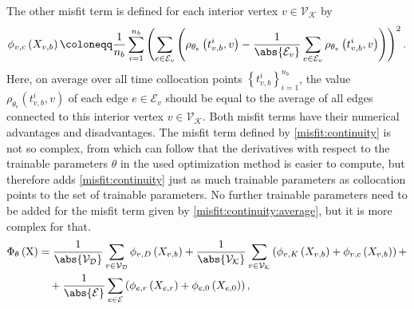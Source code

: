 The other misfit term is defined for each interior vertex $v \in \mathcal{V}_\mathcal{K}$ by 
\begin{equation} 
    \label{misfit:continuity:average}
    \phi_{v,c}  \left( X_{v,b} \right) \coloneqq \frac{1}{n_b}  \sum_{i=1}^{n_b} \left( \sum_{e \in \mathcal{E}_v} \left( \rho_{\theta_e}  \left( t_{v,b}^i, v \right) - \frac{1}{\abs{\mathcal{E}_v}} \sum_{e \in \mathcal{E}_v} \rho_{\theta_e}  \left( t_{v,b}^i, v \right) \right) \right)^2.
\end{equation}
Here, on average over all time collocation points $\left\{ t_{v,b}^i \right\}_{i=1}^{n_b}$, the value $\rho_{\theta_e}  \left( t_{v,b}^i, v \right)$ of each edge $e \in \mathcal{E}_v$ should be equal to the average of all edges connected to this interior vertex $v \in \mathcal{V}_\mathcal{K}$. Both misfit terms have their numerical advantages and disadvantages. The misfit term defined by \cref{misfit:continuity} is not so complex, from which can follow that the derivatives with respect to the trainable parameters $\theta$ in the used optimization method is easier to compute, but therefore adds \cref{misfit:continuity} just as much trainable parameters as collocation points to the set of trainable parameters. No further trainable parameters need to be added for the misfit term given by \cref{misfit:continuity:average}, but it is more complex for that. \\


\begin{equation}
    \label{eq:loss:average}
    \begin{aligned} 
        \Phi_{\theta} \left( \operatorname{X} \right) & =  \frac{1}{\abs{\mathcal{V}_\mathcal{D}}} \sum_{v \in \mathcal{V}_\mathcal{D}} \phi_{v,D} \left( X_{v,b} \right) + \frac{1}{\abs{\mathcal{V}_\mathcal{K}}} \sum_{v \in \mathcal{V}_\mathcal{K}}  \left(  \phi_{v,K}  \left( X_{v,b} \right) + \phi_{v,c} \left( X_{v,b} \right)  \right) + \\
        & \quad + \frac{1}{\abs{\mathcal{E}}} \sum_{e \in \mathcal{E}}  \left(  \phi_{e,r}  \left( X_{e,r} \right) + \phi_{e,0}  \left( X_{e,0} \right)  \right), 
    \end{aligned}
\end{equation}


